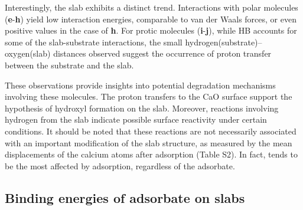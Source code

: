 \documentclass[%
aip,
amsmath,amssymb,
preprint,%
jcp,
showkeys,
]{revtex4-2}
\begin{document}
Interestingly, the  slab exhibits a distinct trend. Interactions with polar molecules (\textbf{e}-\textbf{h}) yield low interaction energies, comparable to van der Waals forces, or even positive values in the case of \textbf{h}. For protic molecules (\textbf{i}-\textbf{j}), while HB accounts for some of the slab-substrate interactions, the small hydrogen(substrate)--oxygen(slab) distances observed suggest the occurrence of proton transfer between the substrate and the slab.

These observations provide insights into potential degradation mechanisms involving these molecules. The proton transfers to the CaO surface support the hypothesis of hydroxyl formation on the slab. Moreover, reactions involving hydrogen from the  slab indicate possible surface reactivity under certain conditions.  It should be noted that these reactions are not necessarily associated with an important modification of the slab structure, as measured by the mean displacements of the calcium atoms after adsorption (Table S2). In fact,  tends to be the most affected by adsorption, regardless of the adsorbate.

\subsection{Binding energies of adsorbate on slabs}\label{sec:BE's}

\newcommand{\XPSsa}[2]{
	\begin{turnpage}
	\begin{figure}
		\centering
		\texttt{[image: Figure\#1]}
		\caption{Difference (dotted line) between the XPS spectra before (dashed line) and after (solid line) adsorption for compounds \textbf{#2} on various substrates, as computed using the \cpx{E_\infty} protocol. Letters indicate mean binding energies for bulk (``b"), surface (``s", with $\star$ marking the atom closest to the adsorbate), surface hydroxides (``h"), and different atoms of the adsorbate.}
		\label{fig:spectraXPSads#2}
	\end{figure}
\end{turnpage}
}
\end{document}
